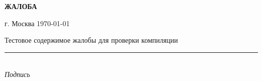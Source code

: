 \documentclass[12pt,a4paper]{article}
\begin{document}
\begin{center}
\textbf{\Large ЖАЛОБА}
\end{center}

\vspace{1cm}

\begin{flushright}
г. Москва \hspace{2cm} \today
\end{flushright}

\vspace{1cm}

Тестовое содержимое жалобы для проверки компиляции

\vspace{1cm}

\begin{center}
\rule{6cm}{0.5pt} \\
\textit{Подпись} \\
\vspace{0.5cm} \\
[ФИО] \\
\end{center}
\end{document}
